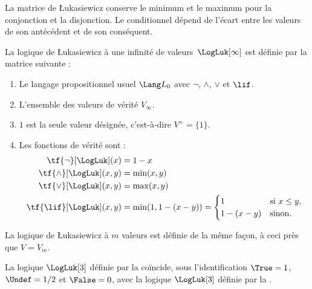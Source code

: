 \documentclass[../../../include/open-logic-section]{subfiles}
\begin{document}


La matrice de \L ukasiewicz conserve le minimum et le maximum
pour la conjonction et la disjonction. Le conditionnel dépend
de l'écart entre les valeurs de son antécédent et de son conséquent.

\begin{defn}
La logique de \L ukasiewicz à une
infinité de valeurs~$\LogLuk[\infty]$
est définie par la matrice suivante :
\begin{enumerate}
  \item Le langage propositionnel usuel
  $\Lang L_0$ avec $\lnot$, $\land$,
  $\lor$ et $\lif$.
  \item L'ensemble des valeurs de vérité
  $V_\infty$.
  \item $1$ est la seule valeur désignée,
  c'est-à-dire $V^+=\{1\}$.
  \item Les fonctions de vérité sont :
  \begin{align*}
    \tf{\lnot}[\LogLuk](x) &=1-x\\
    \tf{\land}[\LogLuk](x,y) &=\min(x,y)\\
    \tf{\lor}[\LogLuk](x,y) &=\max(x,y)\\
    \tf{\lif}[\LogLuk](x,y)
      &=\min(1,1-(x-y))
        =\begin{cases}
          1 & \text{si }x\le y,\\
          1-(x-y) & \text{sinon.}
        \end{cases}
  \end{align*}
\end{enumerate}
La logique de \L ukasiewicz à $m$
valeurs est définie de la même façon,
à ceci près que $V=V_m$.
\end{defn}

\begin{prop}
  La logique $\LogLuk[3]$ définie
  par la 
  coïncide, sous l'identification
  $\True=1$, $\Undef=1/2$ et
  $\False=0$, avec la logique
  $\LogLuk[3]$ définie par la
  .
\end{prop}
\end{document}
